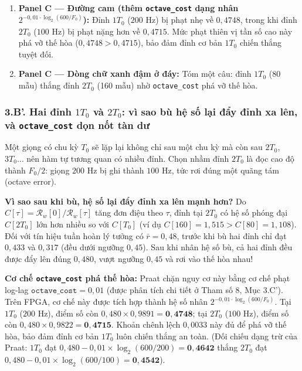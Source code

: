 \documentclass[11pt,a4paper]{article}
\begin{document}
\begin{enumerate}
    \item \textbf{Panel C --- Đường cam (thêm \texttt{octave\_cost} dạng nhân $2^{-0{,}01 \cdot \log_2(600/F_0)}$):} Đỉnh $1T_0$ ($200\text{ Hz}$) bị phạt nhẹ về $0{,}4748$, trong khi đỉnh $2T_0$ ($100\text{ Hz}$) bị phạt nặng hơn về $0{,}4715$. Mức phạt thiên vị tần số cao này phá vỡ thế hòa ($0{,}4748 > 0{,}4715$), bảo đảm đỉnh cơ bản $1T_0$ chiến thắng tuyệt đối.
    \item \textbf{Panel C --- Dòng chữ xanh đậm ở đáy:} Tóm một câu: đỉnh $1T_0$ (80 mẫu) thắng đỉnh $2T_0$ (160 mẫu) nhờ \texttt{octave\_cost} phá vỡ thế hòa.
\end{enumerate}

\subsubsection*{3.B'. Hai đỉnh $1T_0$ và $2T_0$: vì sao bù hệ số lại đẩy đỉnh xa lên, và \texttt{octave\_cost} dọn nốt tàn dư}

Một giọng có chu kỳ $T_0$ sẽ lặp lại không chỉ sau một chu kỳ mà còn sau $2T_0$, $3T_0\dots$ nên hàm tự tương quan có nhiều đỉnh. Chọn nhầm đỉnh $2T_0$ là đọc cao độ thành $F_0/2$: giọng $200\text{ Hz}$ bị ghi thành $100\text{ Hz}$, tức rơi đúng một quãng tám (octave error).

\textbf{Vì sao sau khi bù, hệ số lại đẩy đỉnh xa lên mạnh hơn?} Do $C[\tau] = \mathcal{R}_w[0]/\mathcal{R}_w[\tau]$ tăng đơn điệu theo $\tau$, đỉnh tại $2T_0$ có hệ số phóng đại $C[2T_0]$ lớn hơn nhiều so với $C[T_0]$ (ví dụ $C[160] = 1{,}515 > C[80] = 1{,}108$). Đối với tín hiệu tuần hoàn lý tưởng có $\bar{r} = 0{,}48$, trước khi bù hai đỉnh chỉ đạt $0{,}433$ và $0{,}317$ (đều dưới ngưỡng $0{,}45$). Sau khi nhân hệ số bù, cả hai đỉnh đều được đẩy lên đúng $0{,}480$, vượt ngưỡng $0{,}45$ và rơi vào thế hòa nhau!

\textbf{Cơ chế \texttt{octave\_cost} phá thế hòa:} Praat chặn nguy cơ này bằng cơ chế phạt log-lag $\texttt{octave\_cost} = 0{,}01$ (được phân tích chi tiết ở Tham số 8, Mục 3.C'). Trên FPGA, cơ chế này được tích hợp thành hệ số nhân $2^{-0{,}01 \cdot \log_2(600/F_0)}$. Tại $1T_0$ ($200\text{ Hz}$), điểm số còn $0{,}480 \times 0{,}9891 = \mathbf{0{,}4748}$; tại $2T_0$ ($100\text{ Hz}$), điểm số còn $0{,}480 \times 0{,}9822 = \mathbf{0{,}4715}$. Khoản chênh lệch $0{,}0033$ này đủ để phá vỡ thế hòa, bảo đảm đỉnh cơ bản $1T_0$ luôn chiến thắng an toàn. (Đối chiếu dạng trừ của Praat: $1T_0$ đạt $0{,}480 - 0{,}01 \times \log_2(600/200) = \mathbf{0{,}4642}$ thắng $2T_0$ đạt $0{,}480 - 0{,}01 \times \log_2(600/100) = \mathbf{0{,}4542}$).
\end{document}
